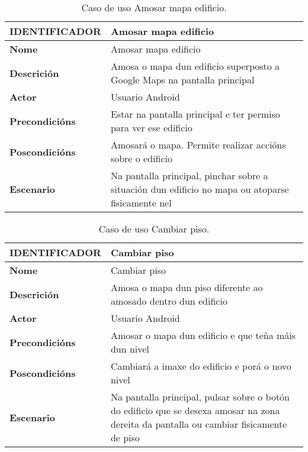 \begin{table} [tbh]
	\begin{tabular}{|l|p{10cm}|}
		\hline 
		\textbf{IDENTIFICADOR}	& \textbf{Amosar mapa edificio} \\ 
		\hline 
		\textbf{Nome} & Amosar mapa edificio \\ 
		\hline 
		\textbf{Descrición} & Amosa o mapa dun edificio superposto a Google Maps na pantalla principal \\ 
		\hline 
		\textbf{Actor} & Usuario Android \\ 
		\hline 
		\textbf{Precondicións} & Estar na pantalla principal e ter permiso para ver ese edificio \\ 
		\hline 
		\textbf{Poscondicións} & Amosará o mapa. Permite realizar accións sobre o edificio \\ 
		\hline 
		\textbf{Escenario} & Na pantalla principal, pinchar sobre a situación dun edificio no mapa ou atoparse fisicamente nel \\ 
		\hline 
	\end{tabular}
	\caption{Caso de uso Amosar mapa edificio.}
	\label{tab:cuAmosarMapaEdificio}
\end{table}

\begin{table} [tbh]
	\begin{tabular}{|l|p{10cm}|}
		\hline 
		\textbf{IDENTIFICADOR}	& \textbf{Cambiar piso} \\ 
		\hline 
		\textbf{Nome} & Cambiar piso \\ 
		\hline 
		\textbf{Descrición} & Amosa o mapa dun piso diferente ao amosado dentro dun edificio \\ 
		\hline 
		\textbf{Actor} & Usuario Android \\ 
		\hline 
		\textbf{Precondicións} & Amosar o mapa dun edificio e que teña máis dun nivel \\ 
		\hline 
		\textbf{Poscondicións} & Cambiará a imaxe do edificio e porá o novo nivel \\ 
		\hline 
		\textbf{Escenario} & Na pantalla principal, pulsar sobre o botón do edificio que se desexa amosar na zona dereita da pantalla ou cambiar fisicamente de piso \\ 
		\hline 
	\end{tabular}
	\caption{Caso de uso Cambiar piso.}
	\label{tab:cuCambiarPiso}
\end{table}

